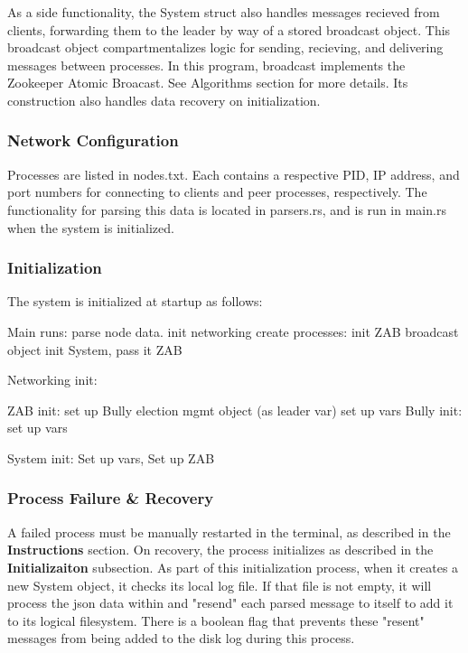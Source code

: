 \documentclass{article}
\begin{document}
		As a side functionality, the System struct also handles messages recieved from clients, forwarding them to the leader by way of a stored broadcast object. This broadcast object compartmentalizes logic for sending, recieving, and delivering messages between processes. In this program, broadcast implements the Zookeeper Atomic Broacast. See Algorithms section for more details. Its construction also handles data recovery on initialization. 

	\subsubsection*{Network Configuration}
		Processes are listed in nodes.txt. Each contains a respective PID, IP address, and port numbers for connecting to clients and peer processes, respectively. The functionality for parsing this data is located in parsers.rs, and is run in main.rs when the system is initialized. 

	\subsubsection*{Initialization}
		The system is initialized at startup as follows: 

		Main runs:    
				parse node data.
				init networking 
				create processes:
					init ZAB broadcast object
					init System, pass it ZAB
		
		Networking init: 

		ZAB init:
				set up Bully election mgmt object (as leader var) 
				set up vars
		Bully init:  
				set up vars

		System init: 
				Set up vars,
				Set up ZAB

	 
		
	\subsubsection*{Process Failure & Recovery}
		A failed process must be manually restarted in the terminal, as described in the \textbf{Instructions} section. On recovery, the process initializes as described in the \textbf{Initializaiton} subsection. As part of this initialization process, when it creates a new System object, it checks its local log file. If that file is not empty, it will process the json data within and "resend" each parsed message to itself to add it to its logical filesystem. There is a boolean flag that prevents these "resent" messages from being added to the disk log during this process.
\end{document}
